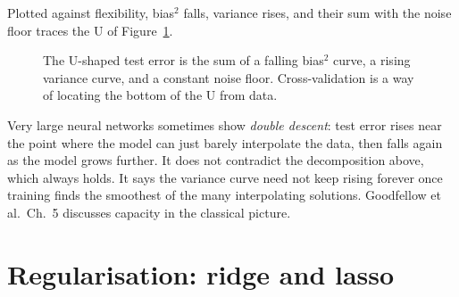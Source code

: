 Plotted against flexibility, bias$^2$ falls, variance rises, and their sum with the noise floor
traces the U of Figure~\ref{fig:ml-biasvar}.

\begin{figure}[H]
\centering
{}
\caption{The U-shaped test error is the sum of a falling bias$^2$ curve, a rising variance
curve, and a constant noise floor. Cross-validation is a way of locating the bottom of the U
from data.}
\label{fig:ml-biasvar}
\end{figure}

\begin{connectionbox}
Very large neural networks sometimes show \emph{double descent}: test error rises near the
point where the model can just barely interpolate the data, then falls again as the model
grows further. It does not contradict the decomposition above, which always holds. It says the
variance curve need not keep rising forever once training finds the smoothest of the many
interpolating solutions. Goodfellow et al.\ Ch.~5 discusses capacity in the classical picture.
\end{connectionbox}

\section{Regularisation: ridge and lasso}
\label{sec:ml-reg}

